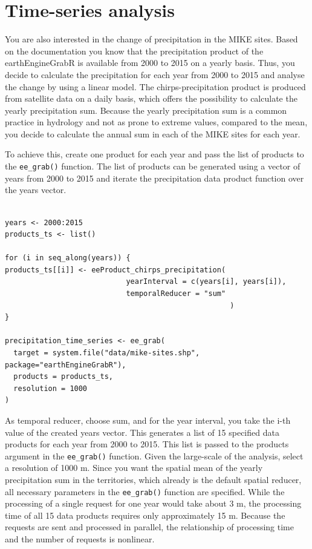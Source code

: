 \section{Time-series analysis}

You are also interested in the change of precipitation in the MIKE sites. Based on the documentation you know that the precipitation product of the earthEngineGrabR is available from 2000 to 2015 on a yearly basis. Thus, you decide to calculate the precipitation for each year from 2000 to 2015 and analyse the change by using a linear model. The chirps-precipitation product is produced from satellite data on a daily basis, which offers the possibility to calculate the yearly precipitation sum. Because the yearly precipitation sum is a common practice in hydrology and not as prone to extreme values, compared to the mean, you decide to calculate the annual sum in each of the MIKE sites for each year. 

To achieve this, create one product for each year and pass the list of products to the \texttt{ee\_grab()} function.
The list of products can be generated using a vector of years from 2000 to 2015 and iterate the precipitation data product function over the years vector.

\newpage

\begin{lstlisting}

years <- 2000:2015
products_ts <- list()

for (i in seq_along(years)) {
products_ts[[i]] <- eeProduct_chirps_precipitation(
							yearInterval = c(years[i], years[i]), 
							temporalReducer = "sum"
													)
}

precipitation_time_series <- ee_grab(
  target = system.file("data/mike-sites.shp", package="earthEngineGrabR"),
  products = products_ts,
  resolution = 1000
)
\end{lstlisting}


As temporal reducer, choose sum, and for the year interval, you take the i-th value of the created years vector. This generates a list of 15 specified data products for each year from 2000 to 2015. This list is passed to the products argument in the \texttt{ee\_grab()} function.
Given the large-scale of the analysis, select a resolution of 1000 m. Since you want the spatial mean of the yearly precipitation sum in the territories, which already is the default spatial reducer, all necessary parameters in the \texttt{ee\_grab()} function are specified. While the processing of a single request for one year would take about 3 m, the processing time of all 15 data products requires only approximately 15 m. Because the requests are sent and processed in parallel, the relationship of processing time and the number of requests is nonlinear. 

